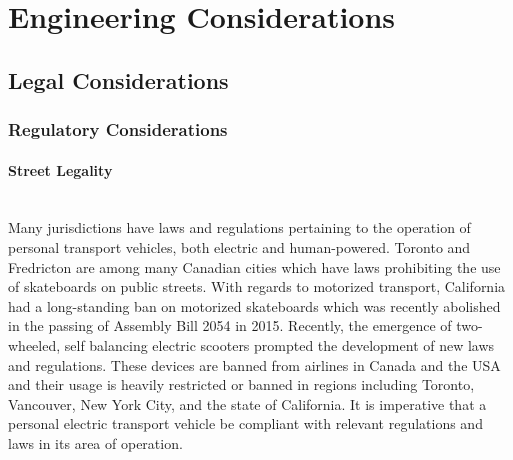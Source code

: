\section{Engineering Considerations}
\subsection{Legal Considerations}

\subsubsection{Regulatory Considerations}

\paragraph{Street Legality}\mbox{}\\
Many jurisdictions have laws and regulations pertaining to the operation of personal transport vehicles, both electric and human-powered. 
Toronto and Fredricton are among many Canadian cities which have laws prohibiting the use of skateboards on public streets. \cite{TOLaws} 
With regards to motorized transport, California had a long-standing ban on motorized skateboards which was recently abolished in the passing of Assembly Bill 2054 in 2015. \cite{OCLaws} \cite{WSJLaws}
Recently, the emergence of two-wheeled, self balancing electric scooters prompted the development of new laws and regulations. 
These devices are banned from airlines in Canada and the USA and their usage is heavily restricted or banned in regions including Toronto, Vancouver, New York City, and the state of California. \cite{leetboard}
It is imperative that a personal electric transport vehicle be compliant with relevant regulations and laws in its area of operation.


